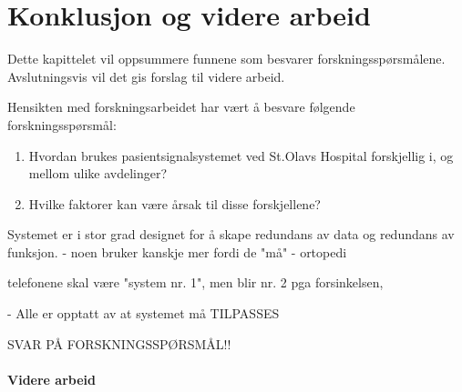 \chapter{Konklusjon og videre arbeid}
\label{chp:konklusjon} 
Dette kapittelet vil oppsummere funnene som besvarer forskningsspørsmålene. Avslutningsvis vil det gis forslag til videre arbeid.


\noindent
Hensikten med forskningsarbeidet har vært å besvare følgende forskningsspørsmål:

\begin{enumerate}
\item Hvordan brukes pasientsignalsystemet ved St.Olavs Hospital forskjellig i, og mellom ulike avdelinger? 
\item Hvilke faktorer kan være årsak til disse forskjellene?
\end{enumerate}








Systemet er i stor grad designet for å skape redundans av data og redundans av funksjon.
- noen bruker kanskje mer fordi de "må" - ortopedi	

telefonene skal være "system nr. 1", men blir nr. 2 pga forsinkelsen,

- Alle er opptatt av at systemet må TILPASSES

SVAR PÅ FORSKNINGSSPØRSMÅL!!

\subsubsection{Videre arbeid}